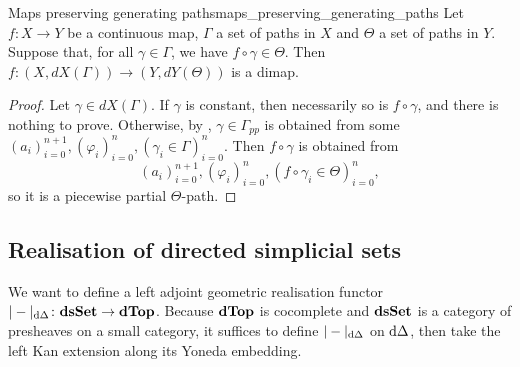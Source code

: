 \begin{clem}{Maps preserving generating paths}{maps_preserving_generating_paths}
Let \( f\colon X \to Y \) be a continuous map, \( \Gamma \) a set of paths in \( X \) and \( \Theta \) a set of paths in \( Y \).
Suppose that, for all \( \gamma \in \Gamma \), we have \( f \circ \gamma \in \Theta \).
Then \( f\colon (X, dX(\Gamma)) \to (Y, dY(\Theta)) \) is a dimap.
\end{clem}
\begin{proof}
Let \( \gamma \in dX(\Gamma) \).
If \( \gamma \) is constant, then necessarily so is \( f \circ \gamma \), and there is nothing to prove.
Otherwise, by , \( \gamma \in \Gamma_\textit{pp} \) is obtained from some \( (a_i)_{i=0}^{n+1}, (\varphi_i)_{i=0}^n, (\gamma_i \in \Gamma)_{i=0}^n \).
Then \( f \circ \gamma \) is obtained from
\begin{equation*}
	(a_i)_{i=0}^{n+1}, (\varphi_i)_{i=0}^n, (f \circ \gamma_i \in \Theta)_{i=0}^n, 
\end{equation*}
so it is a piecewise partial \( \Theta \)-path.
\end{proof}


\subsection{Realisation of directed simplicial sets}

We want to define a left adjoint geometric realisation functor \( |-|_{\mathrm{d}\Delta}\colon \mathbf{dsSet} \to \mathbf{dTop} \).
Because \( \mathbf{dTop} \) is cocomplete and \( \mathbf{dsSet} \) is a category of presheaves on a small category, it suffices to define \( |-|_{\mathrm{d}\Delta} \) on \( \mathrm{d}\Delta \), then take the left Kan extension along its Yoneda embedding.

